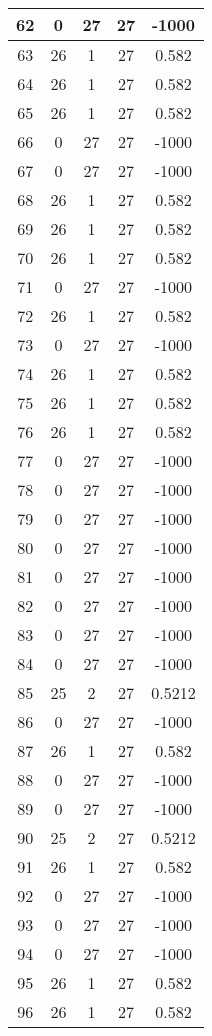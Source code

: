 \documentclass[letterpaper, 12pt]{article}
\begin{document}
\begin{longtable}{|c|c|c|c|c|}
\hline
62 & 0 & 27 & 27 & -1000 \\
\hline
63 & 26 & 1 & 27 & 0.582 \\
\hline
64 & 26 & 1 & 27 & 0.582 \\
\hline
65 & 26 & 1 & 27 & 0.582 \\
\hline
66 & 0 & 27 & 27 & -1000 \\
\hline
67 & 0 & 27 & 27 & -1000 \\
\hline
68 & 26 & 1 & 27 & 0.582 \\
\hline
69 & 26 & 1 & 27 & 0.582 \\
\hline
70 & 26 & 1 & 27 & 0.582 \\
\hline
71 & 0 & 27 & 27 & -1000 \\
\hline
72 & 26 & 1 & 27 & 0.582 \\
\hline
73 & 0 & 27 & 27 & -1000 \\
\hline
74 & 26 & 1 & 27 & 0.582 \\
\hline
75 & 26 & 1 & 27 & 0.582 \\
\hline
76 & 26 & 1 & 27 & 0.582 \\
\hline
77 & 0 & 27 & 27 & -1000 \\
\hline
78 & 0 & 27 & 27 & -1000 \\
\hline
79 & 0 & 27 & 27 & -1000 \\
\hline
80 & 0 & 27 & 27 & -1000 \\
\hline
81 & 0 & 27 & 27 & -1000 \\
\hline
82 & 0 & 27 & 27 & -1000 \\
\hline
83 & 0 & 27 & 27 & -1000 \\
\hline
84 & 0 & 27 & 27 & -1000 \\
\hline
85 & 25 & 2 & 27 & 0.5212 \\
\hline
86 & 0 & 27 & 27 & -1000 \\
\hline
87 & 26 & 1 & 27 & 0.582 \\
\hline
88 & 0 & 27 & 27 & -1000 \\
\hline
89 & 0 & 27 & 27 & -1000 \\
\hline
90 & 25 & 2 & 27 & 0.5212 \\
\hline
91 & 26 & 1 & 27 & 0.582 \\
\hline
92 & 0 & 27 & 27 & -1000 \\
\hline
93 & 0 & 27 & 27 & -1000 \\
\hline
94 & 0 & 27 & 27 & -1000 \\
\hline
95 & 26 & 1 & 27 & 0.582 \\
\hline
96 & 26 & 1 & 27 & 0.582 \\

\end{longtable}
\end{document}
